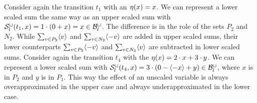 \begin{example}
  Consider again the transition $t_1$ with an $\eta(x) = x$.
  We can represent a lower scaled sum the same way as an upper scaled sum with ${\mathcal{S}^\sqcup_l}(t_1,x) = 1 \cdot (0 + x) = x \in \mathcal{B}^\sqcup_l$.
  The difference is in the role of the sets $P_2$ and $N_2$.
  While $\sum_{v \in P_2} \langle v\rangle$ and $\sum_{v \in N_2} \langle-v\rangle$ are added in upper scaled sums, their lower counterparts $\sum_{v \in P_2} \langle-v\rangle$ and $\sum_{v \in N_2} \langle v\rangle$ are subtracted in lower scaled sums.
  Consider again the transition $t_4$ with the $\eta(x) = 2 \cdot x + 3 \cdot y$.
  We can represent a lower scaled sum with ${\mathcal{S}^\sqcup_l}(t_4,x) = 3 \cdot (0 - \langle-x\rangle + y) \in \mathcal{B}^\sqcup_l$, where $x$ is in $P_2$ and $y$ is in $P_1$.  
  This way the effect of an unscaled variable is always overapproximated in the upper case and always underapproximated in the lower case.
\end{example}

